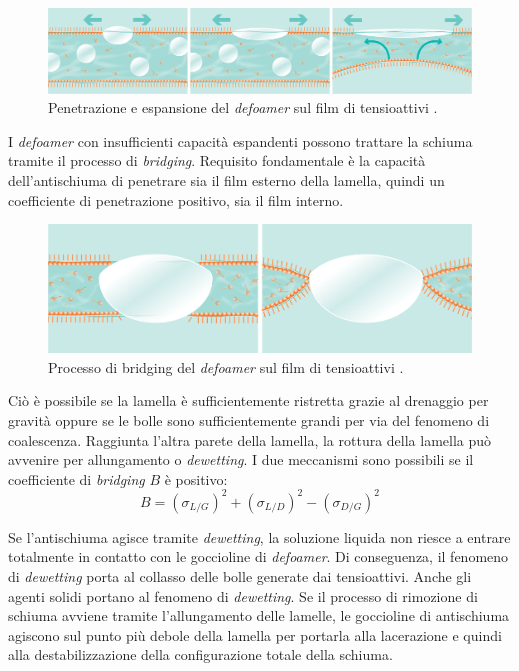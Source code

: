 \begin{figure}[htbp]
    \centering
    \includegraphics[height=.11\textheight]{fig/foamer/penetration.png}
    \caption{Penetrazione e espansione del \textit{defoamer} sul film di tensioattivi \parencite{tego2014brochure}.}
    \label{fig:penetration}
\end{figure}

I \textit{defoamer} con insufficienti capacità espandenti possono trattare la schiuma tramite il processo di \textit{bridging}. Requisito fondamentale è la capacità dell'antischiuma di penetrare sia il film esterno della lamella, quindi un coefficiente di penetrazione positivo, sia il film interno. 

\begin{figure}[htbp]
    \centering
    \includegraphics[height=.11\textheight]{fig/foamer/bridging.png}
    \caption{Processo di bridging del \textit{defoamer} sul film di tensioattivi \parencite{tego2014brochure}.}
    \label{fig:bridging}
\end{figure}

Ciò è possibile se la lamella è sufficientemente ristretta grazie al drenaggio per gravità oppure se le bolle sono sufficientemente grandi per via del fenomeno di coalescenza. Raggiunta l'altra parete della lamella, la rottura della lamella può avvenire per allungamento o \textit{dewetting}. I due meccanismi sono possibili se il coefficiente di \textit{bridging} \(B\) è positivo:
\[B = (\sigma_{L/G})^2 + (\sigma_{L/D})^2 - (\sigma_{D/G})^2 \label{eq:bridging} \]

Se l'antischiuma agisce tramite \textit{dewetting}, la soluzione liquida non riesce a entrare totalmente in contatto con le goccioline di \textit{defoamer}. Di conseguenza, il fenomeno di \textit{dewetting} porta al collasso delle bolle generate dai tensioattivi. Anche gli agenti solidi portano al fenomeno di \textit{dewetting}.
Se il processo di rimozione di schiuma avviene tramite l'allungamento delle lamelle, le goccioline di antischiuma agiscono sul punto più debole della lamella per portarla alla lacerazione e quindi alla destabilizzazione della configurazione totale della schiuma.


